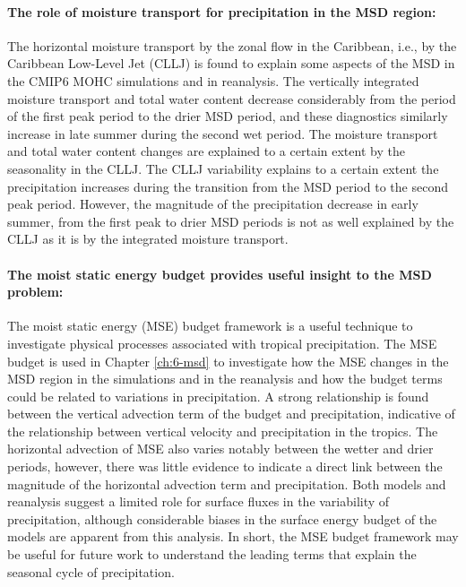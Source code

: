 \paragraph{The role of moisture transport for precipitation in the MSD region:}
The horizontal moisture transport by the zonal flow in the Caribbean, i.e., by the Caribbean Low-Level Jet (CLLJ) is found to explain some aspects of the MSD in the CMIP6 MOHC simulations and in reanalysis. 
The vertically integrated moisture transport and total water content decrease considerably from the period of the first peak period to the drier MSD period, and these diagnostics similarly increase in late summer during the second wet period.
The moisture transport and total water content changes are explained to a certain extent by the seasonality in the CLLJ. 
The CLLJ variability explains to a certain extent the precipitation increases during the transition from the MSD period to the second peak period. 
However, the magnitude of the precipitation decrease in early summer, from the first peak to drier MSD periods is not as well explained by the CLLJ as it is by the integrated moisture transport. 

\paragraph{The moist static energy budget provides useful insight to the MSD problem:}
The moist static energy (MSE) budget framework is a useful technique to investigate physical processes associated with tropical precipitation. 
The MSE budget is used in Chapter \ref{ch:6-msd} to investigate how the MSE changes in the MSD region in the simulations and in the reanalysis and how the budget terms could be related to variations in precipitation. 
A strong relationship is found between the vertical advection term of the budget and precipitation, indicative of the relationship between vertical velocity and precipitation in the tropics. %
The horizontal advection of MSE also varies notably between the wetter and drier periods, however, there was little evidence to indicate a direct link between the magnitude of the horizontal advection term and precipitation. 
Both models and reanalysis suggest a limited role for surface fluxes in the variability of precipitation, although considerable biases in the surface energy budget of the models are apparent from this analysis. 
In short, the MSE budget framework may be useful for future work to understand the leading terms that explain the seasonal cycle of precipitation.

